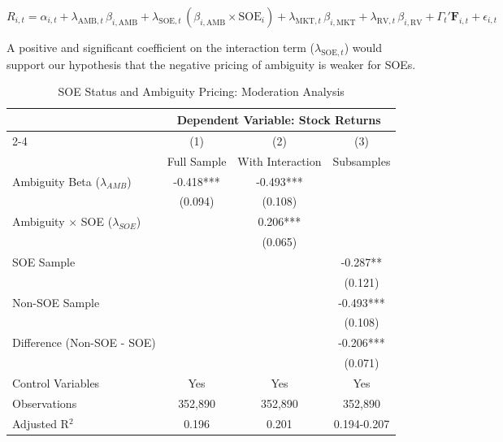 \documentclass[preprint,12pt,authoryear]{elsarticle}
\begin{document}
\begin{equation}
R_{i,t} = \alpha_{i,t} + \lambda_{\text{AMB},t} \, \beta_{i,\text{AMB}} + \lambda_{\text{SOE},t} \, (\beta_{i,\text{AMB}} \times \text{SOE}_i) + \lambda_{\text{MKT},t} \, \beta_{i,\text{MKT}} + \lambda_{\text{RV},t} \, \beta_{i,\text{RV}} + \Gamma_{t}' \mathbf{F}_{i,t} + \epsilon_{i,t}
\end{equation}

A positive and significant coefficient on the interaction term ($\lambda_{\text{SOE},t}$) would support our hypothesis that the negative pricing of ambiguity is weaker for SOEs.

\begin{table}[htbp]
\centering
\caption{SOE Status and Ambiguity Pricing: Moderation Analysis}
\label{tab:soe_moderation}
\begin{threeparttable}
\begin{tabular*}{\textwidth}{@{\extracolsep{\fill}} lccc @{\extracolsep{\fill}}}
\toprule
& \multicolumn{3}{c}{Dependent Variable: Stock Returns} \\
\cmidrule(lr){2-4}
& (1) & (2) & (3) \\
& Full Sample & With Interaction & Subsamples \\
\midrule
\midrule
Ambiguity Beta ($\lambda_{AMB}$) & -0.418*** & -0.493*** &  \\
& (0.094) & (0.108) &  \\
\midrule
Ambiguity $\times$ SOE ($\lambda_{SOE}$) & & 0.206*** &  \\
& & (0.065) &  \\
\midrule
SOE Sample & & & -0.287** \\
& & & (0.121) \\
\midrule
Non-SOE Sample & & & -0.493*** \\
& & & (0.108) \\
\midrule
Difference (Non-SOE - SOE) & & & -0.206*** \\
& & & (0.071) \\
\midrule
Control Variables & Yes & Yes & Yes \\
\midrule
Observations & 352,890 & 352,890 & 352,890 \\
Adjusted R$^2$ & 0.196 & 0.201 & 0.194-0.207 \\
\bottomrule
\end{tabular*}
\begin{tablenotes}[flushleft]
\small

\end{tablenotes}
\end{threeparttable}
\end{table}
\end{document}
